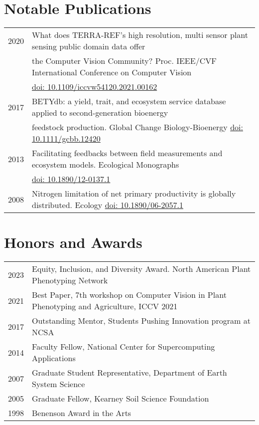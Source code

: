 \documentclass[a4paper,10pt]{article}
\begin{document}
\section{Notable Publications}
\begin{tabular}{rl}
2020 & What does TERRA-REF’s high resolution, multi sensor plant sensing public domain data offer \\
     & the Computer Vision Community? Proc. IEEE/CVF  International Conference on
Computer Vision \\ & \href{https://repository.arizona.edu/handle/10150/663361}{doi: 10.1109/iccvw54120.2021.00162}\\
2017 & BETYdb: a yield, trait, and ecosystem service database applied to second-generation bioenergy \\       
     &  feedstock production. Global Change Biology-Bioenergy \href{https://doi.org/10.1111/gcbb.12420}{doi: 10.1111/gcbb.12420}\\
2013 & Facilitating feedbacks between field measurements and ecosystem models. Ecological Monographs \\ & \href{https://doi.org/10.1890/12-0137.1}{doi: 10.1890/12-0137.1}\\
2008 & Nitrogen limitation of net primary productivity is globally distributed. Ecology \href{https://doi.org/10.1890/06-2057.1}{doi: 10.1890/06-2057.1}%


\end{tabular}


\section{Honors and Awards}
\begin{tabular}{rl}
2023 & Equity, Inclusion, and Diversity Award. North American Plant Phenotyping Network\\
2021 & Best Paper, 7th workshop on Computer Vision in Plant Phenotyping and Agriculture, ICCV 2021  \\
2017 & Outstanding Mentor, Students Pushing Innovation program at NCSA \\ 
2014 & Faculty Fellow, National Center for Supercomputing Applications \\
2007 & Graduate Student Representative, Department of Earth System Science\\
2005 & Graduate Fellow, Kearney Soil Science Foundation\\
1998 & Benenson Award in the Arts\\
\end{tabular}
\end{document}
